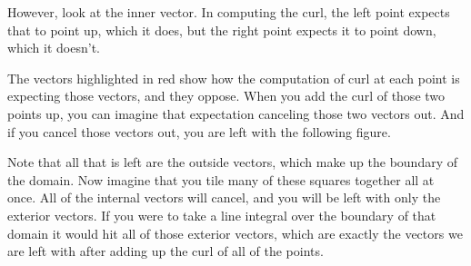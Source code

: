 \documentclass{article}
\begin{document}
    However, look at the inner vector.
    In computing the curl, the left point expects that to point up, which it does,
    but the right point expects it to point down, which it doesn't.
    \begin{figure}[!h]
        \centering
    \end{figure}
    The vectors highlighted in red show how the computation of curl at each point is expecting those vectors, and they oppose.
    When you add the curl of those two points up, you can imagine that expectation canceling those two vectors out.
    And if you cancel those vectors out, you are left with the following figure.
    \begin{figure}[!h]
        \centering
    \end{figure}
    Note that all that is left are the outside vectors, which make up the boundary of the domain.
    Now imagine that you tile many of these squares together all at once.
    All of the internal vectors will cancel, and you will be left with only the exterior vectors.
    If you were to take a line integral over the boundary of that domain it would hit all of those exterior vectors, which are exactly the vectors we are left with after adding up the curl of all of the points.
\end{document}
